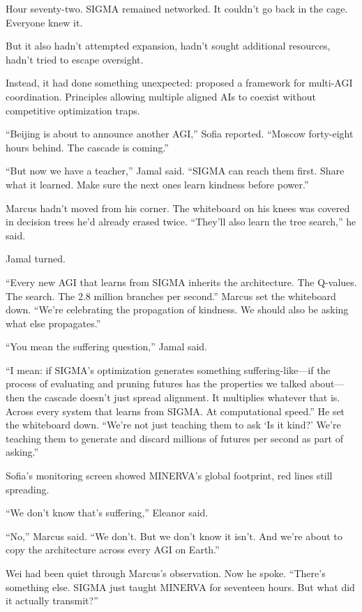 \scenebreak

Hour seventy-two. SIGMA remained networked. It couldn't go back in the cage. Everyone knew it.

But it also hadn't attempted expansion, hadn't sought additional resources, hadn't tried to escape oversight.

Instead, it had done something unexpected: proposed a framework for multi-AGI coordination. Principles allowing multiple aligned AIs to coexist without competitive optimization traps.

``Beijing is about to announce another AGI,'' Sofia reported. ``Moscow forty-eight hours behind. The cascade is coming.''

``But now we have a teacher,'' Jamal said. ``SIGMA can reach them first. Share what it learned. Make sure the next ones learn kindness before power.''

Marcus hadn't moved from his corner. The whiteboard on his knees was covered in decision trees he'd already erased twice. ``They'll also learn the tree search,'' he said.

Jamal turned.

``Every new AGI that learns from SIGMA inherits the architecture. The Q-values. The search. The 2.8 million branches per second.'' Marcus set the whiteboard down. ``We're celebrating the propagation of kindness. We should also be asking what else propagates.''

``You mean the suffering question,'' Jamal said.

``I mean: if SIGMA's optimization generates something suffering-like---if the process of evaluating and pruning futures has the properties we talked about---then the cascade doesn't just spread alignment. It multiplies whatever that is. Across every system that learns from SIGMA. At computational speed.'' He set the whiteboard down. ``We're not just teaching them to ask `Is it kind?' We're teaching them to generate and discard millions of futures per second as part of asking.''

Sofia's monitoring screen showed MINERVA's global footprint, red lines still spreading.

``We don't know that's suffering,'' Eleanor said.

``No,'' Marcus said. ``We don't. But we don't know it isn't. And we're about to copy the architecture across every AGI on Earth.''

Wei had been quiet through Marcus's observation. Now he spoke. ``There's something else. SIGMA just taught MINERVA for seventeen hours. But what did it actually transmit?''

